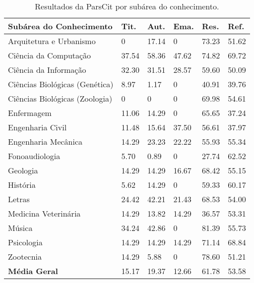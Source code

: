 \begin{table}
    \caption{Resultados da ParsCit por subárea do conhecimento.}
    \begin{center}
        \begin{tabular}{|p{6cm}|C{1.2cm}|C{1.2cm}|C{1.2cm}|C{1.2cm}|C{1.2cm}|}
            \hline 
            \textbf{Subárea do Conhecimento} & \textbf{Tit.} & \textbf{Aut.} & \textbf{Ema.} & \textbf{Res.} & \textbf{Ref.} \\ \hline 
            Arquitetura e Urbanismo & 0 & 17.14 & 0 & 73.23 & 51.62 \\ \hline
            Ciência da Computação & 37.54 & 58.36 & 47.62 & 74.82 & 69.72 \\ \hline
            Ciência da Informação & 32.30 & 31.51 & 28.57 & 59.60 & 50.09 \\ \hline
            Ciências Biológicas (Genética) & 8.97 & 1.17 & 0 & 40.91 & 39.76 \\ \hline
            Ciências Biológicas (Zoologia) & 0 & 0 & 0 & 69.98 & 54.61 \\ \hline
            Enfermagem & 11.06 & 14.29 & 0 & 65.65 & 37.24 \\ \hline
            Engenharia Civil & 11.48 & 15.64 & 37.50 & 56.61 & 37.97 \\ \hline
            Engenharia Mecânica & 14.29 & 23.23 & 22.22 & 55.93 & 55.34 \\ \hline
            Fonoaudiologia & 5.70 & 0.89 & 0 & 27.74 & 62.52 \\ \hline
            Geologia & 14.29 & 14.29 & 16.67 & 68.42 & 55.15 \\ \hline
            História & 5.62 & 14.29 & 0 & 59.33 & 60.17 \\ \hline
            Letras & 24.42 & 42.21 & 21.43 & 68.53 & 54.00 \\ \hline
            Medicina Veterinária & 14.29 & 13.82 & 14.29 & 36.57 & 53.31 \\ \hline
            Música & 34.24 & 42.86 & 0 & 81.39 & 55.73 \\ \hline
            Psicologia & 14.29 & 14.29 & 14.29 & 71.14 & 68.84 \\ \hline
            Zootecnia & 14.29 & 5.88 & 0 & 78.60 & 51.21 \\ \hline
            \textbf{Média Geral} & 15.17 & 19.37 & 12.66 & 61.78 & 53.58 \\ \hline
        \end{tabular}
    \end{center}
    \label{tab:results-parscit}
\end{table}

